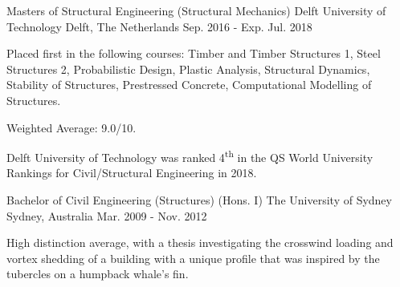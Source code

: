 

\begin{cventries}

    \cventry
    {Masters of Structural Engineering (Structural Mechanics)} %
    {Delft University of Technology} %
    {Delft, The Netherlands} %
    {Sep. 2016 - Exp. Jul. 2018} %
    {
      \begin{cvitems} %
        \item {Placed first in the following courses: Timber and Timber Structures 1, Steel Structures 2, Probabilistic Design, Plastic Analysis, Structural Dynamics, Stability of Structures, Prestressed Concrete, Computational Modelling of Structures.}
         \item {Weighted Average: 9.0/10.}
         \item {Delft University of Technology was ranked 4\textsuperscript{th} in the QS World University Rankings for Civil/Structural Engineering in 2018.}
      \end{cvitems}
    }
    \cventry
    {Bachelor of Civil Engineering (Structures) (Hons. I)} %
    {The University of Sydney} %
    {Sydney, Australia} %
    {Mar. 2009 - Nov. 2012} %
    {
      \begin{cvitems} %
        \item {High distinction average, with a thesis investigating the crosswind loading and vortex shedding of a building with a unique profile that was inspired by the tubercles on a humpback whale's fin.}
      \end{cvitems}
    }

\end{cventries}
